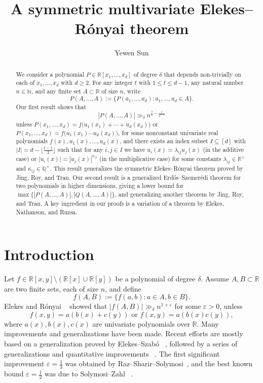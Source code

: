 \documentclass[12pt,reqno]{amsart}
\title{A symmetric multivariate Elekes--R\'{o}nyai theorem}
\author{Yewen Sun}
\numberwithin{equation}{section}
\begin{document}
\begin{abstract}We consider a polynomial $P\in \mathbb{R}[x_{1},\ldots, x_{d}]$ of degree $\delta$ that depends non-trivially on each of $x_1,\ldots,x_d$ with $d\ge 2$. For any integer $t$ with $1\le t\le d-1$, any natural number $n\in\mathbb N$, and any finite set $A\subset\mathbb R$ of size $n$, write
$$P(A,\dots,A):=\{P(a_1,\dots,a_d): a_1,\dots,a_d\in A\}.$$
Our first result shows that $$|P(A,\dots,A)|\gg_{\delta} n^{\frac{3}{2}-\frac{1}{2^{t+1}}}$$ unless
$P(x_1,\dots,x_d)=f\big(u_1(x_1)+\cdots+u_d(x_d)\big)$ or
$P(x_1,\dots,x_d)=f\big(u_1(x_1)\cdots u_d(x_d)\big)$,
for some nonconstant univariate real polynomials $f(x),u_1(x),\ldots,u_d(x)$, and there exists an index subset $I\subseteq[d]$ with $|I|=d-\lfloor \frac{t-1}{2}\rfloor$ such that for any $i,j\in I$ we have $u_i(x)=\lambda_{ij}u_j(x)$ (in the additive case) or $|u_i(x)|=|u_j(x)|^{\kappa_{ij}}$ (in the multiplicative case) for some constants $\lambda_{ij}\in\mathbb R^{\times}$ and $\kappa_{ij}\in\mathbb Q^{+}$. This result generalizes the symmetric Elekes--R\'onyai theorem proved by Jing, Roy, and Tran. 
Our second result is a generalized Erd\H{o}s--Szemer\'edi theorem for two polynomials in higher dimensions, giving a lower bound for $\max\{|P(A,\dots,A)|,|Q(A,\dots,A)|\}$, and generalizing another theorem by Jing, Roy, and Tran. A key ingredient in our proofs is a variation of a theorem by Elekes, Nathanson, and Ruzsa.
\end{abstract}

\maketitle


\section{Introduction}

 Let $f\in \mathbb{R}[x,y]\setminus(\mathbb{R}[x]\cup \mathbb{R}[y])$ be a polynomial of degree $\delta$. Assume $A,B\subset \mathbb{R}$ are two finite sets, each of size $n$, and define $$f(A,B):=\{f(a,b):a\in A, b\in B\}.$$ Elekes and  R\'{o}nyai ~\cite{elekes2000combinatorial} showed that $|f(A, B)| \gg_{\delta} n^{1+\varepsilon}$ for some $\varepsilon > 0$, unless $$f(x, y) = a(b(x) + c(y)) \text{~or~} f(x, y) = a(b(x)c(y)),$$ where $a(x), b(x), c(x)$ are univariate polynomials over $\mathbb{R}$. Many improvements and generalizations have been made. Recent efforts are mostly based on a generalization proved by Elekes--Szab\'{o} ~\cite{elekes2012find}, followed by a series of generalizations and quantitative improvements ~\cite{raz2016polynomials,raz2016polynomials2,raz2018elekes, Bays2018ProjectiveGA, raz2020expanding, solymosi2024improved}. The first significant improvement $\varepsilon=\frac{1}{3}$ was obtained by Raz--Sharir--Solymosi~\cite{raz2016polynomials2}, and the best known bound $\varepsilon =\frac{1}{2}$ was due to Solymosi--Zahl ~\cite{solymosi2024improved}.
\end{document}
